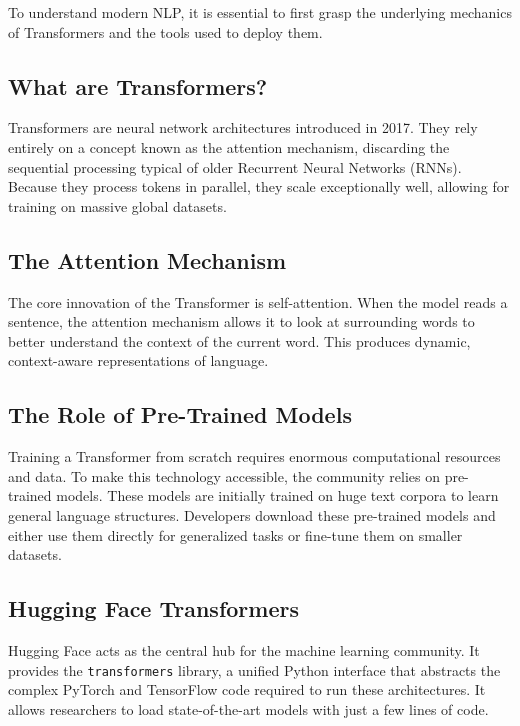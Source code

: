 \documentclass[11pt,a4paper]{article}
\begin{document}
To understand modern NLP, it is essential to first grasp the underlying mechanics of Transformers and the tools used to deploy them.

\subsection{What are Transformers?}
Transformers are neural network architectures introduced in 2017. They rely entirely on a concept known as the attention mechanism, discarding the sequential processing typical of older Recurrent Neural Networks (RNNs). Because they process tokens in parallel, they scale exceptionally well, allowing for training on massive global datasets.

\subsection{The Attention Mechanism}
The core innovation of the Transformer is self-attention. When the model reads a sentence, the attention mechanism allows it to look at surrounding words to better understand the context of the current word. This produces dynamic, context-aware representations of language.

\subsection{The Role of Pre-Trained Models}
Training a Transformer from scratch requires enormous computational resources and data. To make this technology accessible, the community relies on pre-trained models. These models are initially trained on huge text corpora to learn general language structures. Developers download these pre-trained models and either use them directly for generalized tasks or fine-tune them on smaller datasets.

\subsection{Hugging Face Transformers}
Hugging Face acts as the central hub for the machine learning community. It provides the \texttt{transformers} library, a unified Python interface that abstracts the complex PyTorch and TensorFlow code required to run these architectures. It allows researchers to load state-of-the-art models with just a few lines of code.
\end{document}
